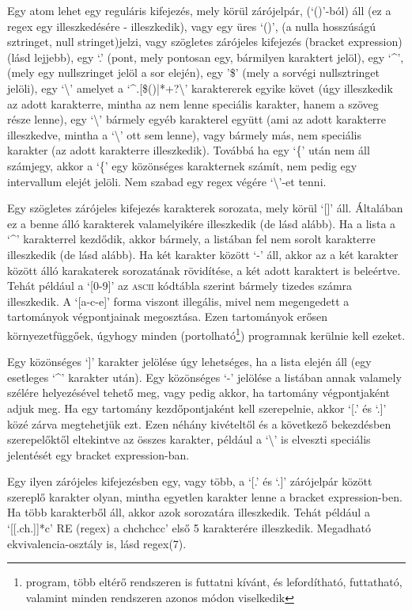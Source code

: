 Egy atom lehet egy reguláris kifejezés, mely körül zárójelpár, (`()'-ból) áll
(ez a regex egy illeszkedésére - illeszkedik), vagy egy üres `()', (a nulla
hosszúságú sztringet, null stringet)jelzi, vagy szögletes zárójeles kifejezés
(bracket expression) (lásd lejjebb), egy `.' (pont, mely pontosan egy, bármilyen
karaktert jelöl), egy `\^{}', (mely egy nullszringet jelöl a sor elején), egy
'\$' (mely a sorvégi nullsztringet jelöli), egy `\textbackslash' amelyet a
`\^{}.[\$()|*+?\textbackslash' karaktererek egyike követ (úgy illeszkedik az
adott karakterre, mintha az nem lenne speciális karakter, hanem a szöveg része
lenne), egy `\textbackslash' bármely egyéb karakterel együtt (ami az adott
karakterre illeszkedve, mintha a `\textbackslash' ott sem lenne), vagy bármely
más, nem speciális karakter (az adott karakterre illeszkedik). Továbbá ha egy
`\{' után nem áll számjegy, akkor a `\{' egy közönséges karakternek számít, nem
pedig egy intervallum elejét jelöli. Nem szabad egy regex végére `\textbackslash'-et
tenni.

Egy szögletes zárójeles kifejezés karakterek sorozata, mely körül `[]'
áll. Általában ez a benne álló karakterek valamelyikére illeszkedik (de lásd
alább). Ha a lista a `\^{}' karakterrel kezdődik, akkor bármely, a listában fel
nem sorolt karakterre illeszkedik (de lásd alább). Ha két karakter között `-'
áll, akkor az a két karakter között álló karakaterek sorozatának rövidítése, a
két adott karaktert is beleértve. Tehát például a `[0-9]' az \textsc{ascii}
kódtábla szerint bármely tizedes számra illeszkedik. A `[a-c-e]' forma viszont
illegális, mivel nem megengedett a tartományok végpontjainak megosztása. Ezen
tartományok erősen környezetfüggőek, úgyhogy minden
(portolható\footnote{program, több eltérő rendszeren is futtatni kívánt, és
lefordítható, futtatható, valamint minden rendszeren azonos módon viselkedik})
programnak kerülnie kell ezeket.

Egy közönséges `]' karakter jelölése úgy lehetséges, ha a lista elején áll (egy
esetleges `\^{}' karakter után). Egy közönséges `-' jelölése a listában annak
valamely szélére helyezésével tehető meg, vagy pedig akkor, ha tartomány
végpontjaként adjuk meg. Ha egy tartomány kezdőpontjaként kell szerepelnie,
akkor `[.' és `.]' közé zárva megtehetjük ezt. Ezen néhány kivételtől és a
következő bekezdésben szerepelőktől eltekintve az összes karakter, például a
`\textbackslash' is elveszti speciális jelentését egy bracket expression-ban.

Egy ilyen zárójeles kifejezésben egy, vagy több, a `[.' és `.]' zárójelpár
között szereplő karakter olyan, mintha egyetlen karakter lenne a bracket
expression-ben. Ha több karakterből áll, akkor azok sorozatára
illeszkedik. Tehát például a `[[.ch.]]*c' RE (regex) a chchchcc' első 5
karakterére illeszkedik. Megadható ekvivalencia-osztály is,
lásd regex(7).

